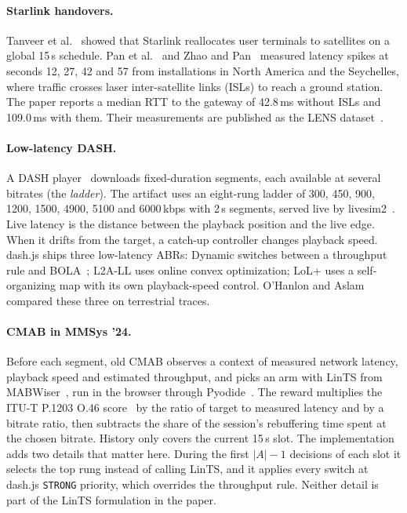 \documentclass[sigconf]{acmart}
\newcommand{\oldcmab}{old CMAB\xspace}
\newcommand{\kbps}{\,kbps\xspace}
\begin{document}
\paragraph{Starlink handovers.} Tanveer et al.~\cite{tanveer2023constellations} showed that Starlink reallocates user terminals to satellites on a global 15\,s schedule. Pan et al.~\cite{pan2023measuring} and Zhao and Pan~\cite{zhao2024mmsys} measured latency spikes at seconds 12, 27, 42 and 57 from installations in North America and the Seychelles, where traffic crosses laser inter-satellite links (ISLs) to reach a ground station. The paper reports a median RTT to the gateway of 42.8\,ms without ISLs and 109.0\,ms with them. Their measurements are published as the LENS dataset~\cite{zhao2024lens}.

\paragraph{Low-latency DASH.} A DASH player~\cite{sodagar2011dash} downloads fixed-duration segments, each available at several bitrates (the \emph{ladder}). The artifact uses an eight-rung ladder of 300, 450, 900, 1200, 1500, 4900, 5100 and 6000\kbps with 2\,s segments, served live by livesim2~\cite{livesim2}. Live latency is the distance between the playback position and the live edge. When it drifts from the target, a catch-up controller changes playback speed. dash.js ships three low-latency ABRs: Dynamic switches between a throughput rule and BOLA~\cite{spiteri2020bola}; L2A-LL uses online convex optimization; LoL+ uses a self-organizing map with its own playback-speed control. O'Hanlon and Aslam~\cite{ohanlon2023latency} compared these three on terrestrial traces.

\paragraph{CMAB in MMSys '24.} Before each segment, \oldcmab observes a context of measured network latency, playback speed and estimated throughput, and picks an arm with LinTS from MABWiser~\cite{strong2021mabwiser}, run in the browser through Pyodide~\cite{pyodide}. The reward multiplies the ITU-T P.1203 O.46 score~\cite{itu2017p1203} by the ratio of target to measured latency and by a bitrate ratio, then subtracts the share of the session's rebuffering time spent at the chosen bitrate. History only covers the current 15\,s slot. The implementation adds two details that matter here. During the first $|A|-1$ decisions of each slot it selects the top rung instead of calling LinTS, and it applies every switch at dash.js \texttt{STRONG} priority, which overrides the throughput rule. Neither detail is part of the LinTS formulation in the paper.
\end{document}
